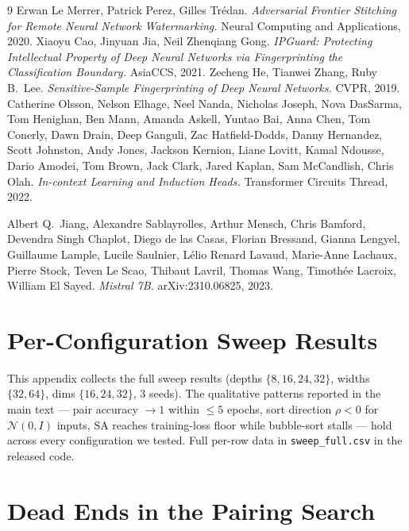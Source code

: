 \documentclass[10pt]{article}
\theoremstyle{remark}
\begin{document}
\begin{thebibliography}{9}
 Erwan Le Merrer, Patrick Perez, Gilles Tr\'edan.
  \emph{Adversarial Frontier Stitching for Remote Neural Network Watermarking.} Neural Computing and Applications, 2020.
 Xiaoyu Cao, Jinyuan Jia, Neil Zhenqiang Gong.
  \emph{IPGuard: Protecting Intellectual Property of Deep Neural Networks via Fingerprinting the Classification Boundary.} AsiaCCS, 2021.
 Zecheng He, Tianwei Zhang, Ruby B.~Lee.
  \emph{Sensitive-Sample Fingerprinting of Deep Neural Networks.} CVPR, 2019.
 Catherine Olsson, Nelson Elhage, Neel Nanda, Nicholas Joseph, Nova DasSarma, Tom Henighan, Ben Mann, Amanda Askell, Yuntao Bai, Anna Chen, Tom Conerly, Dawn Drain, Deep Ganguli, Zac Hatfield-Dodds, Danny Hernandez, Scott Johnston, Andy Jones, Jackson Kernion, Liane Lovitt, Kamal Ndousse, Dario Amodei, Tom Brown, Jack Clark, Jared Kaplan, Sam McCandlish, Chris Olah.
  \emph{In-context Learning and Induction Heads.} Transformer Circuits Thread, 2022.

 Albert Q.\ Jiang, Alexandre Sablayrolles, Arthur Mensch, Chris Bamford,
Devendra Singh Chaplot, Diego de las Casas, Florian Bressand, Gianna Lengyel, Guillaume Lample,
Lucile Saulnier, L\'elio Renard Lavaud, Marie-Anne Lachaux, Pierre Stock, Teven Le Scao,
Thibaut Lavril, Thomas Wang, Timoth\'ee Lacroix, William El Sayed.
\emph{Mistral 7B.} arXiv:2310.06825, 2023.
\end{thebibliography}

\appendix

\section{Per-Configuration Sweep Results}
\label{app:sweep}

This appendix collects the full sweep results (depths
$\{8,16,24,32\}$, widths $\{32,64\}$, dims $\{16,24,32\}$, 3 seeds).
The qualitative patterns reported in the main text --- pair accuracy
$\to 1$ within $\leq 5$ epochs, sort direction $\rho<0$ for
$\mathcal{N}(0,I)$ inputs, SA reaches training-loss floor while
bubble-sort stalls --- hold across every configuration we tested.
Full per-row data in \texttt{sweep\_full.csv} in the released code.

\section{Dead Ends in the Pairing Search}
\label{app:deadends}
\end{document}

